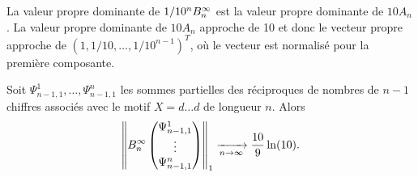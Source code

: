 La valeur propre dominante de $1/10^{n}B_{n}^{\infty}$ est la valeur propre dominante de
$10A_{n}$. La valeur propre dominante de $10A_{n}$ approche de 10 et donc le
vecteur propre approche de $(1, 1/10, \ldots, 1/10^{n-1})^{T}$, o\`u le vecteur
est normalis\'e pour la premi\`ere composante.
\begin{lem}
	Soit $\Psi_{n-1,1}^{1}, \ldots, \Psi_{n-1,1}^{n}$ les sommes partielles des
	r\'eciproques de nombres de $n-1$ chiffres associ\'es avec le motif
	$X=d\ldots d$ de longueur $n$. Alors
	\[
		\left\lVert B_{n}^{\infty} \begin{pmatrix}
			\Psi_{n-1,1}^1 \\
			\vdots \\
			\Psi_{n-1,1}^n 
		\end{pmatrix}\right\rVert_{1} 
		\xrightarrow[n\rightarrow\infty]{} \frac{10}{9}\ln(10).
	\]
	\label{lem:finlem}
\end{lem}
